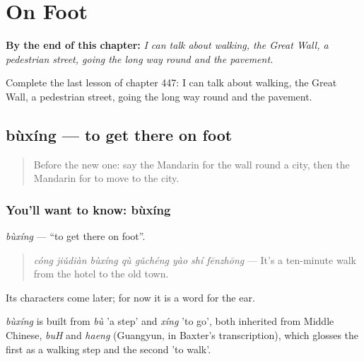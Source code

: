 
\chapter{On Foot}
\label{ch:zh-on-foot}

\begin{chapteropening}
\textbf{By the end of this chapter:} \emph{I can talk about walking, the Great Wall, a pedestrian street, going the long way round and the pavement.}

Complete the last lesson of chapter 447: I can talk about walking, the Great Wall, a pedestrian street, going the long way round and the pavement.
\end{chapteropening}

\section[bùxíng]{bùxíng — to get there on foot}

\label{lesson:ZH-C447-buxing}



\begin{quote}
Before the new one: say the Mandarin for the wall round a city, then the Mandarin for to move to the city.
\end{quote}

\subsection*{You'll want to know: bùxíng}
\emph{bùxíng} — \textquotedblleft{}to get there on foot\textquotedblright{}.

\begin{quote}
\emph{cóng jiǔdiàn bùxíng qù gǔchéng yào shí fēnzhōng} — It's a ten-minute walk from the hotel to the old town.
\end{quote}

Its characters come later; for now it is a word for the ear.

\begin{cousinweb}
\emph{bùxíng} is built from \emph{bù} 'a step' and \emph{xíng} 'to go', both inherited from Middle Chinese, \emph{buH} and \emph{haeng} (Guangyun, in Baxter's transcription), which glosses the first as a walking step and the second 'to walk'.
\end{cousinweb}

